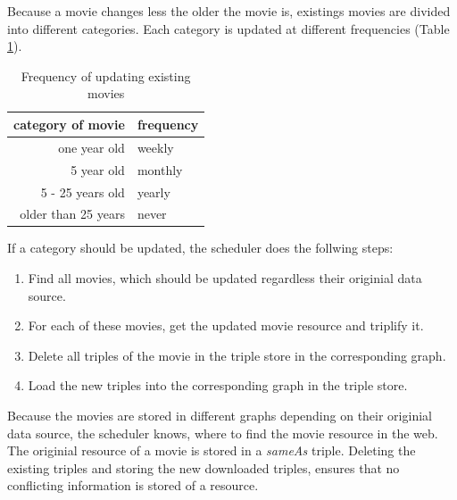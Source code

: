 Because a movie changes less the older the movie is, existings movies are divided into different categories.
Each category is updated at different frequencies (Table \ref{tab_updating_existing}).
\begin{table}[ht]
	\begin{center}
	\begin{tabular}{rl}
		\textbf{category of movie} & \textbf{frequency} \\ \hline
		one year old & weekly \\
		5 year old & monthly \\
		5 - 25 years old & yearly \\
		older than 25 years & never \\
	\end{tabular}
	\end{center}
	\caption{Frequency of updating existing movies}
	\label{tab_updating_existing}
\end{table}
If a category should be updated, the scheduler does the follwing steps:
\begin{enumerate}
	\item Find all movies, which should be updated regardless their originial data source.
	\item For each of these movies, get the updated movie resource and triplify it.
	\item Delete all triples of the movie in the triple store in the corresponding graph.
	\item Load the new triples into the corresponding graph in the triple store.
\end{enumerate}
Because the movies are stored in different graphs depending on their originial data source, the scheduler knows, where to find the movie resource in the web.
The originial resource of a movie is stored in a \emph{sameAs} triple.
Deleting the existing triples and storing the new downloaded triples, ensures that no conflicting information is stored of a resource.